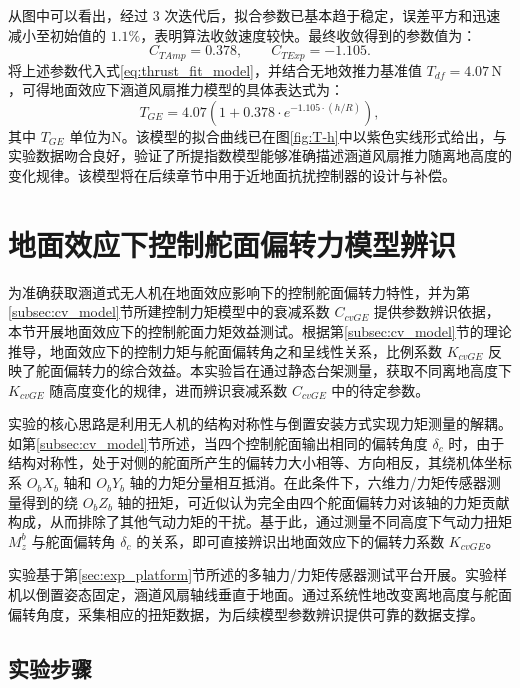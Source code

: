 从图中可以看出，经过 $3$ 次迭代后，拟合参数已基本趋于稳定，误差平方和迅速减小至初始值的 $1.1\%$，表明算法收敛速度较快。最终收敛得到的参数值为：
\begin{equation}
    C_{TAmp} = 0.378,\qquad C_{TExp} = -1.105.
\end{equation}
将上述参数代入式\eqref{eq:thrust_fit_model}，并结合无地效推力基准值 $T_{df} = 4.07\,\mathrm{N}$，可得地面效应下涵道风扇推力模型的具体表达式为：
\begin{equation}
    T_{GE} = 4.07\left(1 + 0.378 \cdot e^{-1.105 \cdot (h/R)}\right),
    \label{eq:fitted_thrust_model}
\end{equation}
其中 $T_{GE}$ 单位为$\mathrm{N}$。该模型的拟合曲线已在图\ref{fig:T-h}中以紫色实线形式给出，与实验数据吻合良好，验证了所提指数模型能够准确描述涵道风扇推力随离地高度的变化规律。该模型将在后续章节中用于近地面抗扰控制器的设计与补偿。

\section{地面效应下控制舵面偏转力模型辨识}
\label{sec:cv_identification}

为准确获取涵道式无人机在地面效应影响下的控制舵面偏转力特性，并为第\ref{subsec:cv_model}节所建控制力矩模型中的衰减系数 $C_{cvGE}$ 提供参数辨识依据，本节开展地面效应下的控制舵面力矩效益测试。根据第\ref{subsec:cv_model}节的理论推导，地面效应下的控制力矩与舵面偏转角之和呈线性关系，比例系数 $K_{cvGE}$ 反映了舵面偏转力的综合效益。本实验旨在通过静态台架测量，获取不同离地高度下 $K_{cvGE}$ 随高度变化的规律，进而辨识衰减系数 $C_{cvGE}$ 中的待定参数。

实验的核心思路是利用无人机的结构对称性与倒置安装方式实现力矩测量的解耦。如第\ref{subsec:cv_model}节所述，当四个控制舵面输出相同的偏转角度 $\delta_c$ 时，由于结构对称性，处于对侧的舵面所产生的偏转力大小相等、方向相反，其绕机体坐标系 $O_bX_b$ 轴和 $O_bY_b$ 轴的力矩分量相互抵消。在此条件下，六维力/力矩传感器测量得到的绕 $O_bZ_b$ 轴的扭矩，可近似认为完全由四个舵面偏转力对该轴的力矩贡献构成，从而排除了其他气动力矩的干扰。基于此，通过测量不同高度下气动力扭矩 $M_{z}^b$ 与舵面偏转角 $\delta_c$ 的关系，即可直接辨识出地面效应下的偏转力系数 $K_{cvGE}$。

实验基于第\ref{sec:exp_platform}节所述的多轴力/力矩传感器测试平台开展。实验样机以倒置姿态固定，涵道风扇轴线垂直于地面。通过系统性地改变离地高度与舵面偏转角度，采集相应的扭矩数据，为后续模型参数辨识提供可靠的数据支撑。

\subsection{实验步骤}
\label{subsec:torque_exp}

